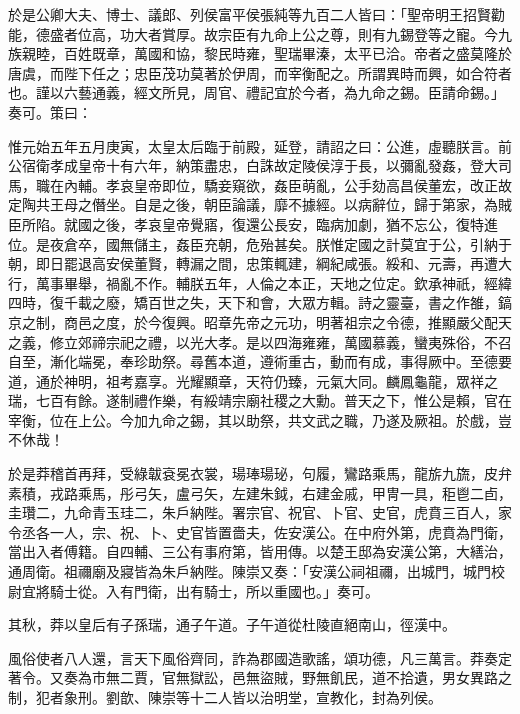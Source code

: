 \begin{pinyinscope}
於是公卿大夫、博士、議郎、列侯富平侯張純等九百二人皆曰：「聖帝明王招賢勸能，德盛者位高，功大者賞厚。故宗臣有九命上公之尊，則有九錫登等之寵。今九族親睦，百姓既章，萬國和協，黎民時雍，聖瑞畢溱，太平已洽。帝者之盛莫隆於唐虞，而陛下任之；忠臣茂功莫著於伊周，而宰衡配之。所謂異時而興，如合符者也。謹以六藝通義，經文所見，周官、禮記宜於今者，為九命之錫。臣請命錫。」奏可。策曰：

惟元始五年五月庚寅，太皇太后臨于前殿，延登，請詔之曰：公進，虛聽朕言。前公宿衛孝成皇帝十有六年，納策盡忠，白誅故定陵侯淳于長，以彌亂發姦，登大司馬，職在內輔。孝哀皇帝即位，驕妾窺欲，姦臣萌亂，公手劾高昌侯董宏，改正故定陶共王母之僭坐。自是之後，朝臣論議，靡不據經。以病辭位，歸于第家，為賊臣所陷。就國之後，孝哀皇帝覺寤，復還公長安，臨病加劇，猶不忘公，復特進位。是夜倉卒，國無儲主，姦臣充朝，危殆甚矣。朕惟定國之計莫宜于公，引納于朝，即日罷退高安侯董賢，轉漏之間，忠策輒建，綱紀咸張。綏和、元壽，再遭大行，萬事畢舉，禍亂不作。輔朕五年，人倫之本正，天地之位定。欽承神祇，經緯四時，復千載之廢，矯百世之失，天下和會，大眾方輯。詩之靈臺，書之作雒，鎬京之制，商邑之度，於今復興。昭章先帝之元功，明著祖宗之令德，推顯嚴父配天之義，修立郊禘宗祀之禮，以光大孝。是以四海雍雍，萬國慕義，蠻夷殊俗，不召自至，漸化端冕，奉珍助祭。尋舊本道，遵術重古，動而有成，事得厥中。至德要道，通於神明，祖考嘉享。光耀顯章，天符仍臻，元氣大同。麟鳳龜龍，眾祥之瑞，七百有餘。遂制禮作樂，有綏靖宗廟社稷之大勳。普天之下，惟公是賴，官在宰衡，位在上公。今加九命之錫，其以助祭，共文武之職，乃遂及厥祖。於戲，豈不休哉！

於是莽稽首再拜，受綠韍袞冕衣裳，瑒琫瑒珌，句履，鸞路乘馬，龍旂九旒，皮弁素積，戎路乘馬，彤弓矢，盧弓矢，左建朱鉞，右建金戚，甲冑一具，秬鬯二卣，圭瓚二，九命青玉珪二，朱戶納陛。署宗官、祝官、卜官、史官，虎賁三百人，家令丞各一人，宗、祝、卜、史官皆置嗇夫，佐安漢公。在中府外第，虎賁為門衛，當出入者傅籍。自四輔、三公有事府第，皆用傳。以楚王邸為安漢公第，大繕治，通周衛。祖禰廟及寢皆為朱戶納陛。陳崇又奏：「安漢公祠祖禰，出城門，城門校尉宜將騎士從。入有門衛，出有騎士，所以重國也。」奏可。

其秋，莽以皇后有子孫瑞，通子午道。子午道從杜陵直絕南山，徑漢中。

風俗使者八人還，言天下風俗齊同，詐為郡國造歌謠，頌功德，凡三萬言。莽奏定著令。又奏為市無二賈，官無獄訟，邑無盜賊，野無飢民，道不拾遺，男女異路之制，犯者象刑。劉歆、陳崇等十二人皆以治明堂，宣教化，封為列侯。


\end{pinyinscope}
